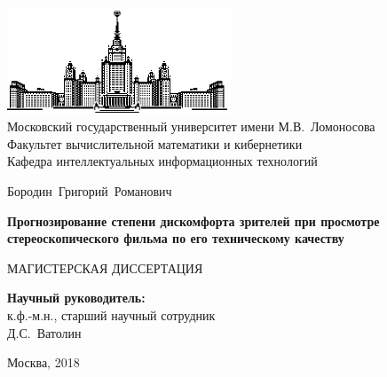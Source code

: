 \documentclass[14pt, a4paper]{extarticle}
\begin{document}
\thispagestyle{empty}

\begin{center}
\ \vspace{-3cm}

\includegraphics[width=0.5\textwidth]{img/msu.eps}\\
{Московский государственный университет имени М.В.~Ломоносова}\\
Факультет вычислительной математики и кибернетики\\
Кафедра интеллектуальных информационных технологий

\vspace{5cm}

{\Large Бородин~Григорий~Романович}

\vspace{1cm}

{\Large\bfseries
Прогнозирование степени дискомфорта зрителей при просмотре стереоскопического фильма по его техническому качеству\\}

\vspace{1cm}

{\large МАГИСТЕРСКАЯ ДИССЕРТАЦИЯ}
\end{center}

\vfill

\begin{flushright}
  \textbf{Научный руководитель:}\\
  к.ф.-м.н., старший научный сотрудник\\
  Д.С.~Ватолин
\end{flushright}

\vfill

\begin{center}
Москва, 2018
\end{center}

\enlargethispage{4\baselineskip}
\end{document}
